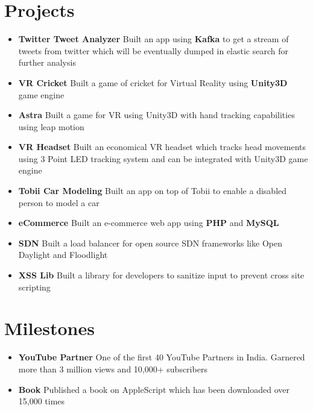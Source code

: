 \documentclass[a4paper,12pt]{article} %
\newcommand\zeroSpacing{0em}
\newcommand{\generalListStart}{\vspace{\zeroSpacing}\begin{itemize}[leftmargin=2em]\setlength\itemsep{-0.4em}}
\newcommand{\generalListEnd}{\end{itemize}\vspace{\zeroSpacing}}
\newcommand{\oneKeyValuePairElement}[2]{
	\item \textbf{#1}{ #2}
}
\begin{document}

\vspace{\zeroSpacing}\section*{Projects}
\generalListStart
	\vspace{-0.8em}\oneKeyValuePairElement{Twitter Tweet Analyzer}{Built an app using \textbf{Kafka} to get a stream of tweets from twitter which will be eventually dumped in elastic search for further analysis}
	\oneKeyValuePairElement{VR Cricket}{Built a game of cricket for Virtual Reality using \textbf{Unity3D} game engine}
	\oneKeyValuePairElement{Astra}{Built a game for VR using Unity3D with hand tracking capabilities using leap motion}
	\oneKeyValuePairElement{VR Headset}{Built an economical VR headset which tracks head movements using 3 Point LED tracking system and can be integrated with Unity3D game engine}
	\oneKeyValuePairElement{Tobii Car Modeling}{Built an app on top of Tobii to enable a disabled person to model a car}
	\oneKeyValuePairElement{eCommerce}{Built an e-commerce web app using \textbf{PHP} and \textbf{MySQL}}
	\oneKeyValuePairElement{SDN}{Built a load balancer for open source SDN frameworks like Open Daylight and Floodlight}
	\oneKeyValuePairElement{XSS Lib}{Built a library for developers to sanitize input to prevent cross site scripting}\vspace{\zeroSpacing}
\generalListEnd


\vspace{\zeroSpacing}\section*{Milestones}

\generalListStart
	\vspace{-0.8em}\oneKeyValuePairElement{YouTube Partner}{One of the first 40 YouTube Partners in India. Garnered more than 3 million views and 10,000+ subscribers}
	\oneKeyValuePairElement{Book}{Published a book on AppleScript which has been downloaded over 15,000 times}
\generalListEnd
\end{document}
